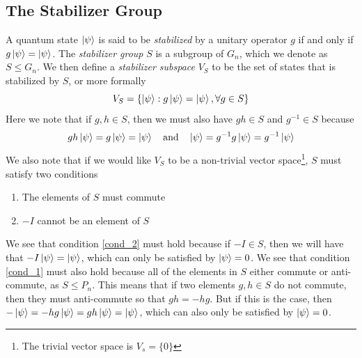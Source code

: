 \documentclass[11pt]{article}
\theoremstyle{definition}
\theoremstyle{plain}
\begin{document}
\subsection{The Stabilizer Group}
A quantum state $\ket{\psi}$ is said to be \emph{stabilized} by a unitary operator $g$ if and only if $g \ket{\psi} = \ket{\psi}$. The \emph{stabilizer group} $S$ is a subgroup of $G_n$, which we denote as $S \leq G_n$. We then define a \emph{stabilizer subspace} $V_S$ to be the set of states that is stabilized by $S$, or more formally
\begin{equation}
  V_S = \left\{ \ket{\psi} : g \ket{\psi} = \ket{\psi} , \forall g \in S \right\}  
\end{equation}
Here we note that if $g, h \in S$, then we must also have $gh \in S$ and $g^{-1} \in S$ because
\begin{equation}\label{stab_1}
  gh \ket{\psi} = g \ket{\psi} = \ket{\psi} \quad \text{and} \quad
  \ket{\psi} = g^{-1} g \ket{\psi} = g^{-1} \ket{\psi}
\end{equation} 
We also note that if we would like $V_S$ to be a non-trivial vector space\footnote{The trivial vector space is $V_s = \{0 \}$}, $S$ must satisfy two conditions
\begin{enumerate}[label = (\arabic*)]
\item\label{cond_1} The elements of $S$ must commute
\item\label{cond_2} $-I$ cannot be an element of $S$ 
\end{enumerate} 
We see that condition {\ref{cond_2}} must hold because if $-I \in S$, then we will have that $-I \ket{\psi} = \ket{\psi}$, which can only be satisfied by $\ket{\psi} = 0$. We see that condition {\ref{cond_1}} must also hold because all of the elements in $S$ either commute or anti-commute, as $S \leq P_n$. This means that if two elements $g, h \in S$ do not commute, then they must anti-commute so that $gh = -hg$. But if this is the case, then $-\ket{\psi} = -hg \ket{\psi} = gh \ket{\psi} = \ket{\psi}$, which can also only be satisfied by $\ket{\psi} = 0$.
\end{document}
